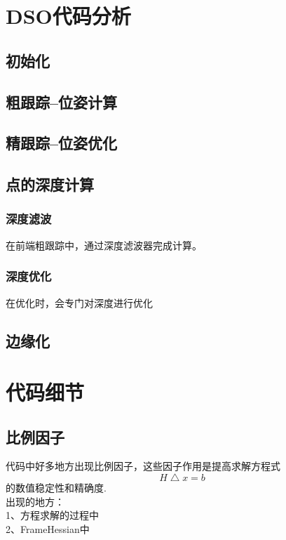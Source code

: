 \chapter{DSO代码分析}

\section{初始化}

\section{粗跟踪--位姿计算}	

\section{精跟踪--位姿优化}

\section{点的深度计算}
\subsection{深度滤波}
在前端粗跟踪中，通过深度滤波器完成计算。

\subsection{深度优化}
在优化时，会专门对深度进行优化


\section{边缘化}


\chapter{代码细节}
\section{比例因子}
代码中好多地方出现比例因子，这些因子作用是提高求解方程式 $$ H\bigtriangleup\!x=b $$的数值稳定性和精确度.\\
出现的地方：\\
1、方程求解的过程中\\
2、FrameHessian中\\
